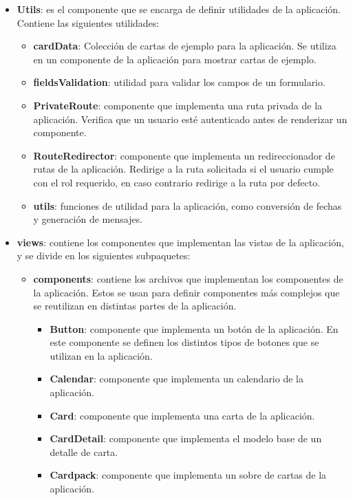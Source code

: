\begin{itemize}
    \item \textbf{Utils}: es el componente que se encarga de definir utilidades de la aplicación. Contiene las siguientes utilidades:
    \begin{itemize}
        \item \textbf{cardData}: Colección de cartas de ejemplo para la aplicación. Se utiliza en un componente de la aplicación para mostrar cartas de ejemplo.
        \item \textbf{fieldsValidation}: utilidad para validar los campos de un formulario.
        \item \textbf{PrivateRoute}: componente que implementa una ruta privada de la aplicación. Verifica que un usuario esté autenticado antes de renderizar un componente.
        \item \textbf{RouteRedirector}: componente que implementa un redireccionador de rutas de la aplicación. Redirige a la ruta solicitada si el usuario cumple con el rol requerido, en caso contrario redirige a la ruta por defecto.
        \item \textbf{utils}: funciones de utilidad para la aplicación, como conversión de fechas y generación de mensajes.
    \end{itemize}
    \item \textbf{views}: contiene los componentes que implementan las vistas de la aplicación, y se divide en los siguientes subpaquetes:
    \begin{itemize}
        \item \textbf{components}: contiene los archivos que implementan los componentes de la aplicación. 
        Estos se usan para definir componentes más complejos que se reutilizan en distintas partes de la aplicación.
        \begin{itemize}
            \item \textbf{Button}: componente que implementa un botón de la aplicación. En este componente se definen los distintos tipos de botones que se utilizan en la aplicación.
            \item \textbf{Calendar}: componente que implementa un calendario de la aplicación.
            \item \textbf{Card}: componente que implementa una carta de la aplicación. 
            \item \textbf{CardDetail}: componente que implementa el modelo base de un detalle de carta.
            \item \textbf{Cardpack}: componente que implementa un sobre de cartas de la aplicación.

\end{itemize}
\end{itemize}
\end{itemize}
